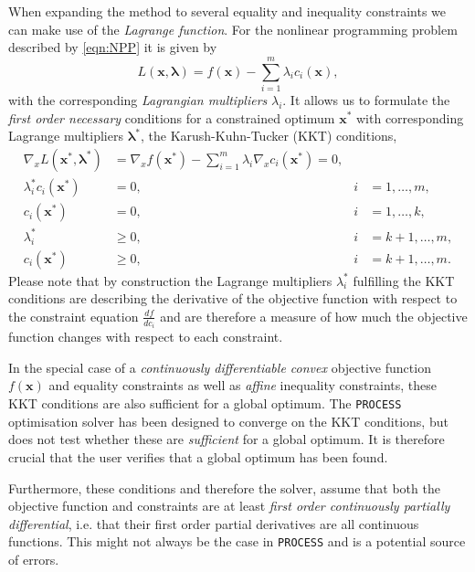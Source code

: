\documentclass[11pt,a4paper]{report}
\newcommand{\process}{\mbox{\texttt{PROCESS}}}
\renewcommand{\vec}[1]{\boldsymbol{#1}}
\begin{document}
When expanding the method to several equality and inequality constraints we
can make use of the {\it Lagrange function}. For the nonlinear programming
problem described by \ref{eqn:NPP} it is given by
\begin{equation}
L(\vec{x},\vec{\lambda}) = f(\vec{x}) - \sum_{i=1}^{m} \lambda_i c_i(\vec{x}),
\end{equation}
with the corresponding {\it Lagrangian multipliers} $\lambda_i$. It allows us
to formulate the {\it first order necessary} conditions for a constrained
optimum $\vec{x}^*$ with corresponding Lagrange multipliers $\vec{\lambda}^*$,
the Karush-Kuhn-Tucker (KKT) conditions,
\begin{subequations}
\begin{align}
\nabla_x L(\vec{x}^*,\vec{\lambda}^*)  &= \nabla_x f(\vec{x}^*) - \sum_{i=1}^{m} \lambda_i \nabla_x c_i(\vec{x}^*) = 0,&&\\
\label{eqn:compl}
\lambda^*_i c_i(\vec{x}^*)       &= 0,                                             &i&=1,\dots,m,\\
c_i(\vec{x}^*)                   &= 0,                                             &i&=1,\dots,k,\\
\lambda^*_i                &\geq 0,                                          &i&=k+1,\dots,m,\\
c_i(\vec{x}^*)                   &\geq 0,                                         &i&=k+1,\dots,m.
\end{align}
\label{eqn:KKT}
\end{subequations}
Please note that by construction the Lagrange multipliers $\lambda_i^*$
fulfilling the KKT conditions are describing the derivative of the objective
function with respect to the constraint equation $\frac{df}{dc_i}$ and are
therefore a measure of how much the objective function changes with respect to
each constraint.

In the special case of a {\it continuously differentiable convex} objective
function $f(\vec{x})$ and equality constraints as well as {\it affine}
inequality constraints, these KKT conditions are also sufficient for a global
optimum. The \process\/ optimisation solver has been designed to converge on
the KKT conditions, but does not test whether these are {\it sufficient} for a
global optimum. It is therefore crucial that the user verifies that a global
optimum has been found.

Furthermore, these conditions and therefore the solver, assume that both the
objective function and constraints are at least {\it first order continuously
  partially differential}, i.e. that their first order partial derivatives are
all continuous functions. This might not always be the case in \process\/ and
is a potential source of errors.
\end{document}

